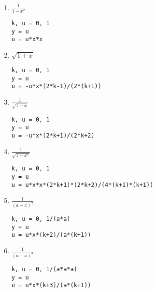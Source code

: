 \documentclass[11pt,a4paper]{article}
\begin{document}
\begin{enumerate}
\item $\displaystyle \frac{1}{1-x^2}$
\hfill
\begin{minipage}[t]{9cm}\footnotesize
\begin{Verbatim}
k, u = 0, 1
y = u
u = u*x*x
\end{Verbatim}
\end{minipage}
\vspace*{3mm}

\item $\displaystyle \sqrt{1+x}$
\hfill
\begin{minipage}[t]{9cm}\footnotesize
\begin{Verbatim}
k, u = 0, 1
y = u
u = -u*x*(2*k-1)/(2*(k+1))
\end{Verbatim}
\end{minipage}
\vspace*{3mm}

\item $\displaystyle \frac{1}{\sqrt{1+x}}$
\hfill
\begin{minipage}[t]{9cm}\footnotesize
\begin{Verbatim}
k, u = 0, 1
y = u
u = -u*x*(2*k+1)/(2*k+2)
\end{Verbatim}
\end{minipage}
\vspace*{3mm}

\item $\displaystyle \frac{1}{\sqrt{1-x^2}}$
\hfill
\begin{minipage}[t]{9cm}\footnotesize
\begin{Verbatim}
k, u = 0, 1
y = u
u = u*x*x*(2*k+1)*(2*k+2)/(4*(k+1)*(k+1))
\end{Verbatim}
\end{minipage}
\vspace*{3mm}

\item $\displaystyle \frac{1}{(a-x)^2}$
\hfill
\begin{minipage}[t]{9cm}\footnotesize
\begin{Verbatim}
k, u = 0, 1/(a*a)
y = u
u = u*x*(k+2)/(a*(k+1))
\end{Verbatim}
\end{minipage}
\vspace*{3mm}

\item $\displaystyle \frac{1}{(a-x)^3}$
\hfill
\begin{minipage}[t]{9cm}\footnotesize
\begin{Verbatim}
k, u = 0, 1/(a*a*a)
y = u
u = u*x*(k+3)/(a*(k+1))
\end{Verbatim}
\end{minipage}
\vspace*{3mm}


\end{enumerate}
\end{document}
